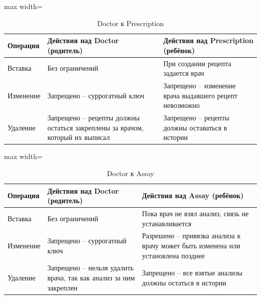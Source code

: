 \documentclass[a4paper, 14pt]{extarticle}
\begin{document}
\begin{table}[h!]
\centering
\captionsetup{singlelinecheck=false, position=top}
\caption{Doctor к Prescription}
\begin{adjustbox}{max width=\textwidth}
\begin{tabular}{|p{}|p{}|p{}|}
\hline
	\textbf{Операция} & \textbf{Действия над Doctor (родитель)} & \textbf{Действия над Prescription (ребёнок)} \\
\hline
Вставка & Без ограничений & При создании рецепта задается врач \\
\hline
Изменение & Запрещено -- суррогатный ключ & Запрещено -- изменение врача выдавшего рецепт невозможно \\
\hline
Удаление & Запрещено -- рецепты должны остаться закреплены за врачом, который их выписал & Запрещено -- рецепты должны оставаться в истории \\
\hline
\end{tabular}
\end{adjustbox}
\label{table:DoctorPrescription}
\end{table}

\begin{table}[h!]
\centering
\captionsetup{singlelinecheck=false, position=top}
\caption{Doctor к Assay}
\begin{adjustbox}{max width=\textwidth}
\begin{tabular}{|p{}|p{}|p{}|}
\hline
	\textbf{Операция} & \textbf{Действия над Doctor (родитель)} & \textbf{Действия над Assay (ребёнок)} \\
\hline
Вставка & Без ограничений & Пока врач не взял анализ, связь не устанавливается \\
\hline
Изменение & Запрещено -- суррогатный ключ & Разрешено -- привязка анализа к врачу может быть изменена или установлена позднее \\
\hline
Удаление & Запрещено -- нельзя удалить врача, так как анализ за ним закреплен & Запрещено -- все взятые анализы должны остаться в истории \\
\hline
\end{tabular}
\end{adjustbox} 
\label{table:DoctorAssay}
\end{table}
\end{document}
